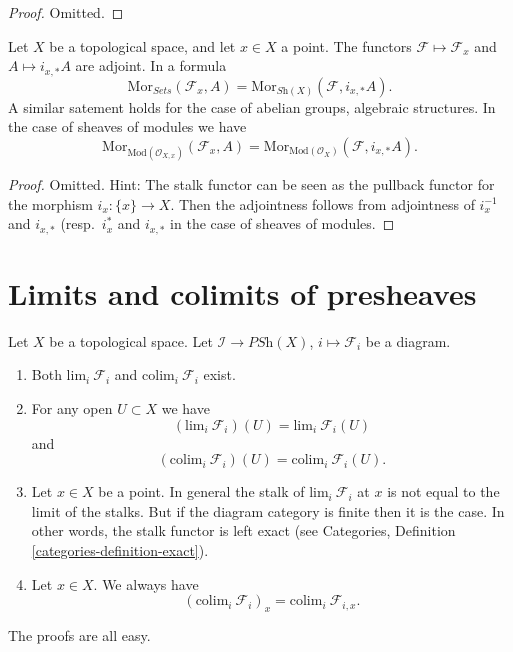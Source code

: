 \begin{proof}
Omitted.
\end{proof}

\begin{lemma}
\label{lemma-stalk-skyscraper-adjoint}
Let $X$ be a topological space, and let $x \in X$ a point.
The functors $\mathcal{F} \mapsto \mathcal{F}_x$ and
$A \mapsto i_{x, *}A$ are adjoint. In a formula
$$
\text{Mor}_{\textit{Sets}}(\mathcal{F}_x, A)
=
\text{Mor}_{\textit{Sh}(X)}(\mathcal{F}, i_{x, *}A).
$$
A similar satement holds for the case of
abelian groups, algebraic structures. In the case of
sheaves of modules we have
$$
\text{Mor}_{\text{Mod}(\mathcal{O}_{X, x})}(\mathcal{F}_x, A)
=
\text{Mor}_{\text{Mod}(\mathcal{O}_X)}(\mathcal{F}, i_{x, *}A).
$$
\end{lemma}

\begin{proof}
Omitted. Hint: The stalk functor can be
seen as the pullback functor for the morphism $i_x : \{x\} \to X$.
Then the adjointness follows from adjointness of
$i_x^{-1}$ and $i_{x, *}$ (resp.\ $i_x^*$ and $i_{x, *}$
in the case of sheaves of modules.
\end{proof}









\section{Limits and colimits of presheaves}
\label{section-limits-presheaves}

\noindent
Let $X$ be a topological space.
Let $\mathcal{I} \to \textit{PSh}(X)$, $i \mapsto \mathcal{F}_i$
be a diagram.
\begin{enumerate}
\item Both $\text{lim}_i\ \mathcal{F}_i$ and $\text{colim}_i\ \mathcal{F}_i$
exist.
\item For any open $U \subset X$ we have
$$
(\text{lim}_i\ \mathcal{F}_i)(U) = \text{lim}_i\ \mathcal{F}_i(U)
$$
and
$$
(\text{colim}_i\ \mathcal{F}_i)(U) =
\text{colim}_i\ \mathcal{F}_i(U).
$$
\item Let $x \in X$ be a point. In general the stalk of
$\text{lim}_i\ \mathcal{F}_i$ at $x$ is not equal to
the limit of the stalks. But if the diagram category is finite
then it is the case. In other words, the stalk functor is
left exact (see Categories, Definition \ref{categories-definition-exact}).
\item Let $x \in X$. We always have
$$
(\text{colim}_i\ \mathcal{F}_i)_x =
\text{colim}_i\ \mathcal{F}_{i, x}.
$$
\end{enumerate}
The proofs are all easy.

